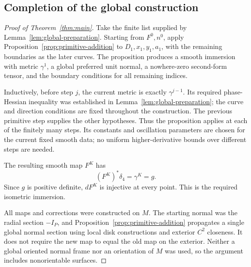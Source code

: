 \subsection{Completion of the global construction}

\begin{proof}[Proof of Theorem~\ref{thm:main}]
Take the finite list supplied by Lemma~\ref{lem:global-preparation}.
Starting from $F^0,n^0$, apply Proposition~\ref{prop:primitive-addition}
to $D_1,x_1,y_1,a_1$, with the remaining boundaries as the later curves.
The proposition produces a smooth immersion with metric $\gamma^1$, a
global preferred unit normal, a nowhere-zero second-form tensor, and the
boundary conditions for all remaining indices.

Inductively, before step $j$, the current metric is exactly
$\gamma^{j-1}$.  Its required phase-Hessian inequality was established in
Lemma~\ref{lem:global-preparation}; the curve and direction conditions are
fixed throughout the construction.  The previous primitive step supplies
the other hypotheses.  Thus the proposition applies at each of the
finitely many steps.  Its constants and oscillation parameters are chosen
for the current fixed smooth data; no uniform higher-derivative bounds
over different steps are needed.

The resulting smooth map $F^K$ has
\[
 (F^K)^*\delta_4=\gamma^K=g.
\]
Since $g$ is positive definite, $dF^K$ is injective at every point.
This is the required isometric immersion.

All maps and corrections were constructed on $M$.  The starting normal
was the radial section $-I_P$, and Proposition~\ref{prop:primitive-addition}
propagates a single global normal section using local disk constructions
and exterior $C^2$ closeness.  It does not require the new map to equal the
old map on the exterior.  Neither a global oriented normal frame nor an
orientation of $M$ was used, so the argument includes nonorientable
surfaces.
\end{proof}
